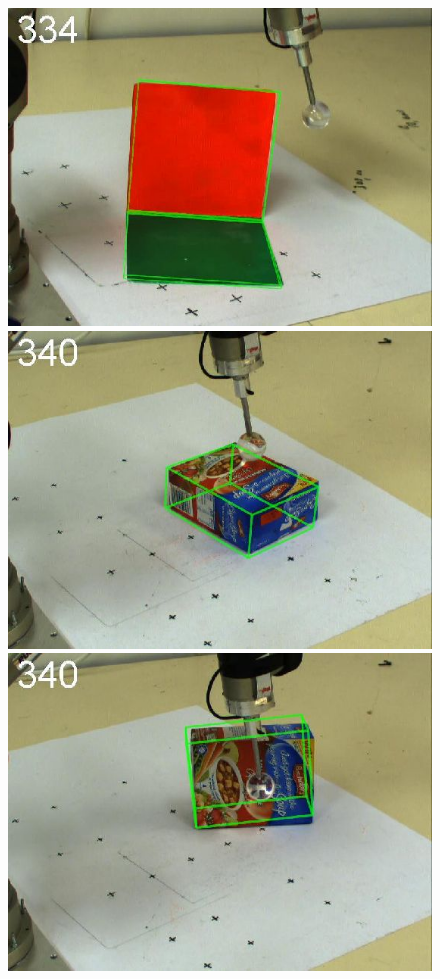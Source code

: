 \begin{figure}[htbp]
{\includegraphics[width=\imgAXwid]{./A1_2exp_876_5}
\includegraphics[width=\imgAXwid]{./A2_2exp_399_5}
\includegraphics[width=\imgAXwid]{./A2_2exp_87_5}
}
\end{figure}

